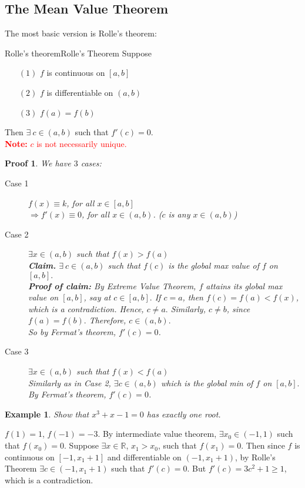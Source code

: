 \documentclass[12pt,a4paper]{article}
\newcommand{\red}[1]{\textcolor{red}{#1}}
\newcommand{\R}{\mathbb{R}}
\theoremstyle{mystyle}
\numberwithin{figure}{subsection}
\newtheorem{exm}{Example}[subsection] %
\newtheorem{pf}{Proof}[subsection]
\newenvironment{ex}{\begin{exBox}\begin{exm}}{\end{exm}\end{exBox}}
\begin{document}
\subsection{The Mean Value Theorem}
The most basic version is Rolle's theorem:
\begin{thm}{Rolle's theorem}{Rolle's Theorem}
Suppose
\begin{itemize}
    \item [$(1)$] $f$ is continuous on $[a,b]$
    \item [$(2)$] $f$ is differentiable on $(a,b)$
    \item [$(3)$] $f(a)=f(b)$ 
\end{itemize}
Then $\exists \ c \in (a,b)$ such that $f'(c)=0.$ \\
\red{\textbf{Note: }$c$ is not necessarily unique.}
\end{thm}
\begin{pf}
We have $3$ cases:
    \begin{description}
    \item[Case 1] $f(x) \equiv k$, for all $x \in [a,b]$ \\
    $\Rightarrow f'(x) \equiv 0$, for all $x \in (a,b)$. ($c$ is any $x \in (a,b)$)
    \item[Case 2] $\exists x \in (a,b)$ such that $f(x)>f(a)$ \\
    \textbf{Claim.} $\exists \ c \in (a,b)$ such that $f(c)$ is the global max value of $f$ on $[a,b].$ \\
    \textbf{Proof of claim: }By Extreme Value Theorem, $f$ attains its global max value on $[a,b]$, say at $c \in [a,b].$ If $c=a$, then $f(c)=f(a)<f(x)$, which is a contradiction. Hence, $c \neq a.$ Similarly, $c \neq b$, since $f(a)=f(b).$ Therefore, $c \in (a,b).$ \\
    So by Fermat's theorem, $f'(c)=0$.
    \item[Case 3] $\exists x \in (a,b)$ such that $f(x)<f(a)$ \\
    Similarly as in Case 2, $\exists c \in (a,b)$ which is the global min of $f$ on $[a,b].$ By Fermat's theorem, $f'(c)=0$.
\end{description}
\end{pf}
\begin{ex}
Show that $x^3+x-1=0$ has exactly one root.
\end{ex}
$f(1)=1$, $f(-1)=-3$. By intermediate value theorem, $\exists x_0 \in (-1,1)$ such that $f(x_0)=0$.
Suppose $\exists x \in \R$, $x_1 > x_0$, such that $f(x_1)=0$. Then since $f$ is continuous on $[-1,x_1+1]$ and differentiable on $(-1,x_1+1)$, by Rolle's Theorem $\exists c \in (-1,x_1+1)$ such that $f'(c)=0.$ But $f'(c)=3c^2+1 \ge 1$, which is a contradiction.
\end{document}
